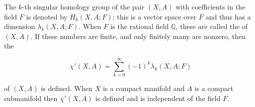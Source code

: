 The $k$-th singular homology group of the pair $(X,A)$ with coefficients in the field $F$ is denoted by $H_k(X,A;F)$; this is a vector space over $F$ and thus has a dimension $\lambda_k(X,A;F)$. When $F$ is the rational field $\mathbb{Q}$, these are called the  of $(X,A)$. If these numbers are finite, and only finitely many are nonzero, then the 

$$\chi'(X,A) = \sum_{k=0}^{\infty} (-1)^k \lambda_k(X,A;F)$$

of $(X,A)$ is defined. When $X$ is a compact manifold and $A$ is a compact submanifold then $\chi'(X,A)$ is defined and is independent of the field $F$.

